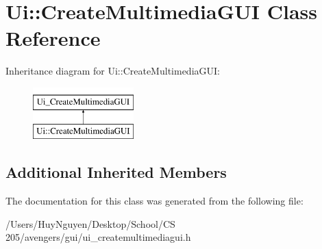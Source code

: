 \hypertarget{classUi_1_1CreateMultimediaGUI}{}\section{Ui\+:\+:Create\+Multimedia\+G\+UI Class Reference}
\label{classUi_1_1CreateMultimediaGUI}
Inheritance diagram for Ui\+:\+:Create\+Multimedia\+G\+UI\+:\begin{figure}[H]
\begin{center}
\leavevmode
\includegraphics[height=2.000000cm]{classUi_1_1CreateMultimediaGUI}
\end{center}
\end{figure}
\subsection*{Additional Inherited Members}


The documentation for this class was generated from the following file\+:\begin{DoxyCompactItemize}
\item 
/\+Users/\+Huy\+Nguyen/\+Desktop/\+School/\+C\+S 205/avengers/gui/ui\+\_\+createmultimediagui.\+h\end{DoxyCompactItemize}
